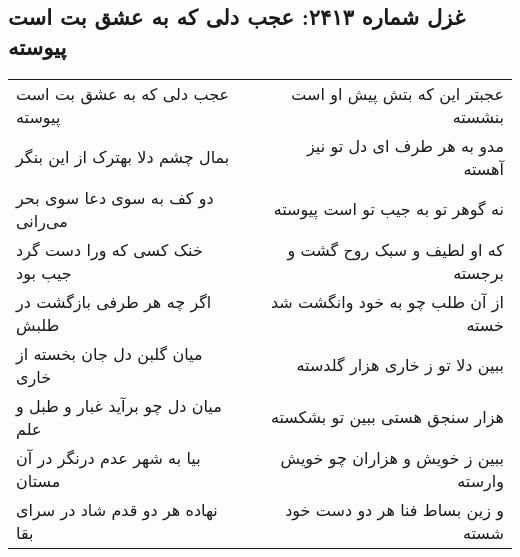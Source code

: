 \begin{center}
\section*{غزل شماره ۲۴۱۳: عجب دلی که به عشق بت است پیوسته}
\label{sec:2413}
\begin{longtable}{l p{0.5cm} r}
عجب دلی که به عشق بت است پیوسته
&&
عجبتر این که بتش پیش او است بنشسته
\\
بمال چشم دلا بهترک از این بنگر
&&
مدو به هر طرف ای دل تو نیز آهسته
\\
دو کف به سوی دعا سوی بحر می‌رانی
&&
نه گوهر تو به جیب تو است پیوسته
\\
خنک کسی که ورا دست گرد جیب بود
&&
که او لطیف و سبک روح گشت و برجسته
\\
اگر چه هر طرفی بازگشت در طلبش
&&
از آن طلب چو به خود وانگشت شد خسته
\\
میان گلبن دل جان بخسته از خاری
&&
ببین دلا تو ز خاری هزار گلدسته
\\
میان دل چو برآید غبار و طبل و علم
&&
هزار سنجق هستی ببین تو بشکسته
\\
بیا به شهر عدم درنگر در آن مستان
&&
ببین ز خویش و هزاران چو خویش وارسته
\\
نهاده هر دو قدم شاد در سرای بقا
&&
و زین بساط فنا هر دو دست خود شسته
\\
\end{longtable}
\end{center}
